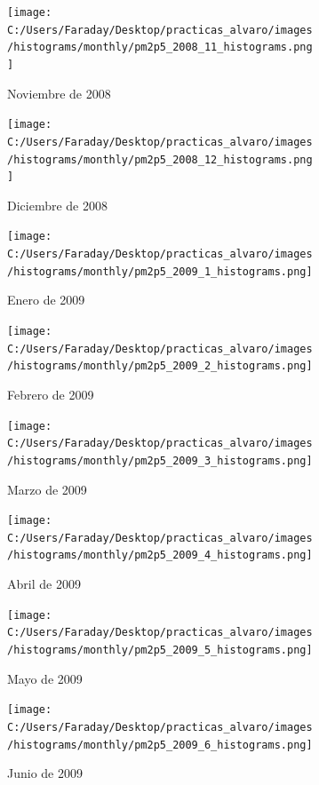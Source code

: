 \documentclass[12pt]{article}
\begin{document}
\begin{figure}[H]
\centering
\begin{subfigure}[h]{0.45\textwidth}
\texttt{[image: C:/Users/Faraday/Desktop/practicas\_alvaro/images/histograms/monthly/pm2p5\_2008\_11\_histograms.png]}
\caption{Noviembre de 2008}
\label{fig:hist-mon-4-11-2008}
\end{subfigure}
%
\begin{subfigure}[H]{0.45\textwidth}
\texttt{[image: C:/Users/Faraday/Desktop/practicas\_alvaro/images/histograms/monthly/pm2p5\_2008\_12\_histograms.png]}
\caption{Diciembre de 2008}
\label{fig:hist-mon-4-12-2008}
\end{subfigure}
\caption{}
\end{figure}

\newpage

\begin{figure}[H]
\centering
\begin{subfigure}[h]{0.45\textwidth}
\texttt{[image: C:/Users/Faraday/Desktop/practicas\_alvaro/images/histograms/monthly/pm2p5\_2009\_1\_histograms.png]}
\caption{Enero de 2009}
\label{fig:hist-mon-4-1-2009}
\end{subfigure}
%
\begin{subfigure}[H]{0.45\textwidth}
\texttt{[image: C:/Users/Faraday/Desktop/practicas\_alvaro/images/histograms/monthly/pm2p5\_2009\_2\_histograms.png]}
\caption{Febrero de 2009}
\label{fig:hist-mon-4-2-2009}
\end{subfigure}
\caption{}
\end{figure}

\begin{figure}[H]
\centering
\begin{subfigure}[h]{0.45\textwidth}
\texttt{[image: C:/Users/Faraday/Desktop/practicas\_alvaro/images/histograms/monthly/pm2p5\_2009\_3\_histograms.png]}
\caption{Marzo de 2009}
\label{fig:hist-mon-4-3-2009}
\end{subfigure}
%
\begin{subfigure}[H]{0.45\textwidth}
\texttt{[image: C:/Users/Faraday/Desktop/practicas\_alvaro/images/histograms/monthly/pm2p5\_2009\_4\_histograms.png]}
\caption{Abril de 2009}
\label{fig:hist-mon-4-4-2009}
\end{subfigure}
\caption{}
\end{figure}

\begin{figure}[H]
\centering
\begin{subfigure}[h]{0.45\textwidth}
\texttt{[image: C:/Users/Faraday/Desktop/practicas\_alvaro/images/histograms/monthly/pm2p5\_2009\_5\_histograms.png]}
\caption{Mayo de 2009}
\label{fig:hist-mon-4-5-2009}
\end{subfigure}
%
\begin{subfigure}[H]{0.45\textwidth}
\texttt{[image: C:/Users/Faraday/Desktop/practicas\_alvaro/images/histograms/monthly/pm2p5\_2009\_6\_histograms.png]}
\caption{Junio de 2009}
\label{fig:hist-mon-4-6-2009}
\end{subfigure}
\caption{}
\end{figure}
\end{document}
